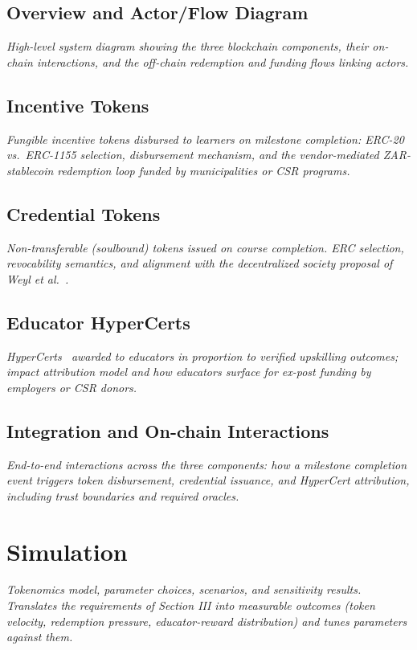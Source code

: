 \documentclass[conference]{IEEEtran}
\begin{document}
\subsection{Overview and Actor/Flow Diagram}
\textit{High-level system diagram showing the three blockchain components, their on-chain interactions, and the off-chain redemption and funding flows linking actors.}

\subsection{Incentive Tokens}
\textit{Fungible incentive tokens disbursed to learners on milestone completion: ERC-20 vs.\ ERC-1155 selection, disbursement mechanism, and the vendor-mediated ZAR-stablecoin redemption loop funded by municipalities or CSR programs.}

\subsection{Credential Tokens}
\textit{Non-transferable (soulbound) tokens issued on course completion. ERC selection, revocability semantics, and alignment with the decentralized society proposal of Weyl et al.~\cite{weyl2022decentralized}.}

\subsection{Educator HyperCerts}
\textit{HyperCerts~\cite{dalrymple2022hypercerts} awarded to educators in proportion to verified upskilling outcomes; impact attribution model and how educators surface for ex-post funding by employers or CSR donors.}

\subsection{Integration and On-chain Interactions}
\textit{End-to-end interactions across the three components: how a milestone completion event triggers token disbursement, credential issuance, and HyperCert attribution, including trust boundaries and required oracles.}

\section{Simulation}
\textit{Tokenomics model, parameter choices, scenarios, and sensitivity results. Translates the requirements of Section III into measurable outcomes (token velocity, redemption pressure, educator-reward distribution) and tunes parameters against them.}
\end{document}
